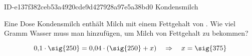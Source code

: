 \begin{exercise}
      {ID-e137f382ceb53a4920cde9d427928a97e5a38bd0}
      {Kondensmilch}
  \ifproblem\problem\par
    Eine Dose Kondensmilch enthält  Milch mit einem Fettgehalt von
    . Wie viel Gramm Wasser muss man hinzufügen, um Milch von 
    Fettgehalt zu bekommen?
  \fi
  \ifoutcome\outcome\par
    \begin{equation*}
      0,\!1\cdot\text{\sig{250}}=0,\!04\cdot(\text{\sig{250}}+x)
      \quad\Rightarrow\quad
      x=\text{\sig{375}}
    \end{equation*}
  \fi
\end{exercise}
